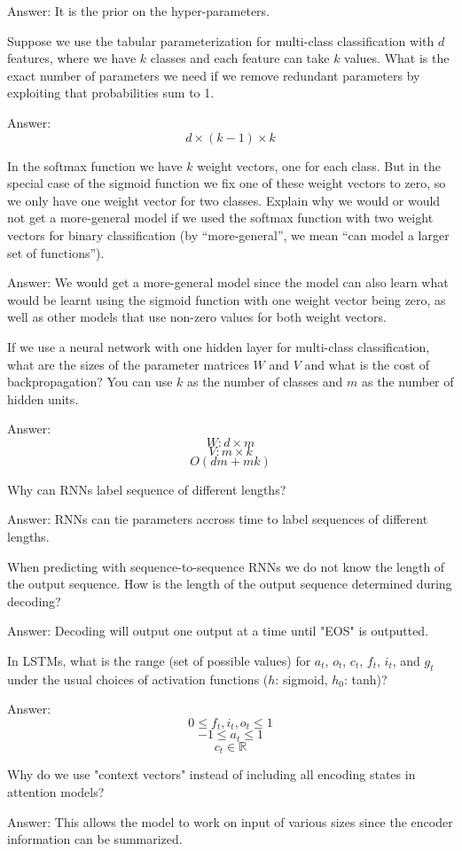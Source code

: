 \documentclass{article}
\def\ans#1{\par\gre{Answer: #1}}
\def\gre#1{{\color{gre}#1}}
\begin{document}
{\ans{
It is the prior on the hyper-parameters.
}
\item Suppose we use the tabular parameterization for multi-class classification with $d$ features, where we have $k$ classes and each feature can take $k$ values. What is the exact number of parameters we need if we remove redundant parameters by exploiting that probabilities sum to 1.
\ans{
\[d\times(k-1)\times k\]
}
\item In the softmax function we have $k$ weight vectors, one for each class. But in the special case of the sigmoid function we fix one of these weight vectors to zero, so we only have one weight vector for two classes. Explain why we would or would not get a more-general model if we used the softmax function with two weight vectors for binary classification (by ``more-general'', we mean ``can model a larger set of functions'').
\ans{
We would get a more-general model since the model can also learn what would be learnt using the sigmoid function with one weight vector being zero, as well as other models that use non-zero values for both weight vectors.
}
\pagebreak
\item If we use a neural network with one hidden layer for multi-class classification, what are the sizes of the parameter matrices $W$ and $V$ and what is the cost of backpropagation? You can use $k$ as the number of classes and $m$ as the number of hidden units.
\ans{
\[W: d \times m\]
\[V: m \times k\]
\[O(dm + mk)\]
}
\item Why can RNNs label sequence of different lengths?
\ans{
RNNs can tie parameters accross time to label sequences of different lengths.
}
\item When predicting with sequence-to-sequence RNNs we do not know the length of the output sequence. How is the length of the output sequence determined during decoding?
\ans{
Decoding will output one output at a time until "EOS" is outputted.
}
\item In LSTMs, what is the range (set of possible values) for $a_t$, $o_t$, $c_t$, $f_t$, $i_t$, and $g_t$ under the usual choices of activation functions ($h$: sigmoid, $h_0$: tanh)?
\ans{
\[0\leq f_t,i_t,o_t\leq 1\]
\[-1\leq a_t \leq 1\]
\[c_t\in \mathbb{R}\]
}
\item Why do we use "context vectors" instead of including all encoding states in attention models?
\ans{
This allows the model to work on input of various sizes since the encoder information can be summarized.
}
}


\pagebreak
\end{document}
